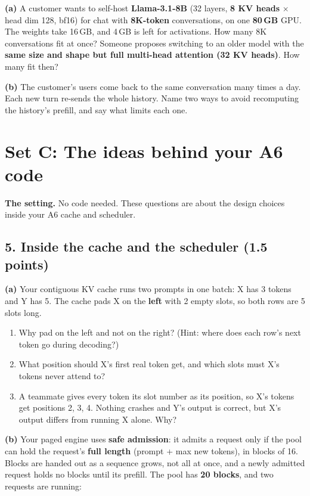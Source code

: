 \documentclass[10pt]{article}
\newcommand{\answerbox}[1]{%
  \begin{tcolorbox}[colback=white, colframe=black!40, boxrule=0.4pt,
                    arc=0pt, height=#1]\end{tcolorbox}}
\begin{document}
\textbf{(a)} A customer wants to self-host \textbf{Llama-3.1-8B} (32
layers, \textbf{8 KV heads} $\times$ head dim 128, bf16) for chat with
\textbf{8K-token} conversations, on one \textbf{80\,GB} GPU. The weights
take 16\,GB, and 4\,GB is left for activations. How many 8K conversations
fit at once? Someone proposes switching to an older model with the
\textbf{same size and shape but full multi-head attention (32 KV heads)}.
How many fit then?
\answerbox{6cm}

\textbf{(b)} The customer's users come back to the same conversation many
times a day. Each new turn re-sends the whole history. Name two ways to
avoid recomputing the history's prefill, and say what limits each one.
\answerbox{6cm}

\newpage
\section*{Set C: The ideas behind your A6 code}

\textbf{The setting.} No code needed. These questions are about the
design choices inside your A6 cache and scheduler.

\subsection*{5. Inside the cache and the scheduler (1.5 points)}

\textbf{(a)} Your contiguous KV cache runs two prompts in one batch: X has
3 tokens and Y has 5. The cache pads X on the \textbf{left} with 2 empty
slots, so both rows are 5 slots long.
\begin{enumerate}[label=(\roman*), nosep]
\item Why pad on the left and not on the right? (Hint: where does each
  row's next token go during decoding?)
\item What position should X's first real token get, and which slots must
  X's tokens never attend to?
\item A teammate gives every token its slot number as its position, so
  X's tokens get positions 2, 3, 4. Nothing crashes and Y's output is
  correct, but X's output differs from running X alone. Why?
\end{enumerate}
\answerbox{5cm}

\textbf{(b)} Your paged engine uses \textbf{safe admission}: it admits a
request only if the pool can hold the request's \textbf{full length}
(prompt + max new tokens), in blocks of 16. Blocks are handed out as a
sequence grows, not all at once, and a newly admitted request holds no
blocks until its prefill. The pool has \textbf{20 blocks}, and two
requests are running:
\end{document}
